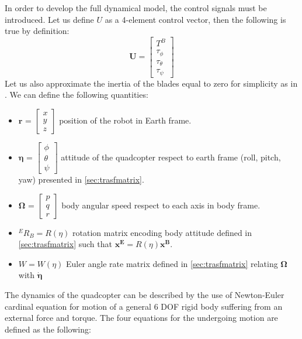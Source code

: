 In order to develop the full dynamical model, the control signals must be introduced. Let us define $U$ as a 4-element control vector, then the following is true by definition:
\begin{equation}
\textbf{U} = \begin{bmatrix}
T^B\\\tau_\phi \\ \tau_\theta \\ \tau_\psi
\end{bmatrix}
\label{eq:inputs}
\end{equation}
Let us also approximate the inertia of the blades equal to zero for simplicity as in \cite{Vendittelli}. We can define the following quantities:\begin{itemize}
\item $\boldsymbol{r}$ = $\begin{bmatrix} x\\y\\z\end{bmatrix}$ position of the robot in Earth frame.
\item $\boldsymbol{\eta}$ = $\begin{bmatrix} \phi\\\theta\\\psi\end{bmatrix}$ attitude of the quadcopter respect to earth frame (roll, pitch, yaw) presented in \ref{sec:trasfmatrix}.
\item $\boldsymbol{\Omega}$ = $\begin{bmatrix} p\\q\\r\end{bmatrix}$ body angular speed respect to each axis in body frame.
\item ${}^ER_B = R(\eta)$ rotation matrix encoding body attitude defined in \ref{sec:trasfmatrix} such that $\boldsymbol{x^E} =  R(\eta) \boldsymbol{x^B}$.

\item $W = W(\eta)$ Euler angle rate matrix defined in \ref{sec:trasfmatrix} relating $\boldsymbol{\Omega}$ with $\dot{\boldsymbol{\eta}}$ 
\end{itemize}
The dynamics of the quadcopter can be described by the use of Newton-Euler cardinal equation for motion of a general 6 DOF rigid body suffering from an external force and torque. The four equations for the undergoing motion are defined as the following:


